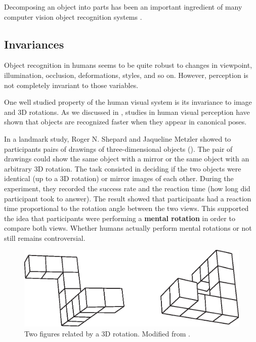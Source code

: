 Decomposing an object into parts has been an important ingredient of many computer vision object recognition systems \cite{Felzenszwalb2010,Fischler1973,Weber2000}. 

\subsection{Invariances}

Object recognition in humans seems to be quite robust to changes in viewpoint, illumination, occlusion, deformations, styles, and so on. However, perception is not completely invariant to those variables.

One well studied property of the human visual system is its invariance to image and 3D rotations.  As we discussed in \chap{\ref{chapter:bias_and_shift}}, studies in human visual perception have shown that objects are recognized faster when they appear in canonical poses. 

In a landmark study, Roger N. Shepard and Jaqueline Metzler \cite{Shepard1971aa} showed to participants pairs of drawings of three-dimensional objects (\fig{\ref{fig:mental_rotation}}). The pair of drawings could show the same object with a mirror or the same object with an arbitrary 3D rotation. The task consisted in deciding if the two objects were identical (up to a 3D rotation) or mirror images of each other. During the experiment, they recorded the success rate and the reaction time (how long did participant took to answer). The result showed that participants had a reaction time proportional to the rotation angle between the two views. This supported the idea that participants were performing a {\bf mental rotation} in order to compare both views. Whether humans actually perform mental rotations or not still remains controversial. 


\begin{figure}
\centerline{
\includegraphics[width=0.6\linewidth]{figures/object_recognition/mental_rotation.eps}
}
\caption{Two figures related by a 3D rotation. Modified from \cite{Shepard1971aa}.}
\label{fig:mental_rotation}
\end{figure}

